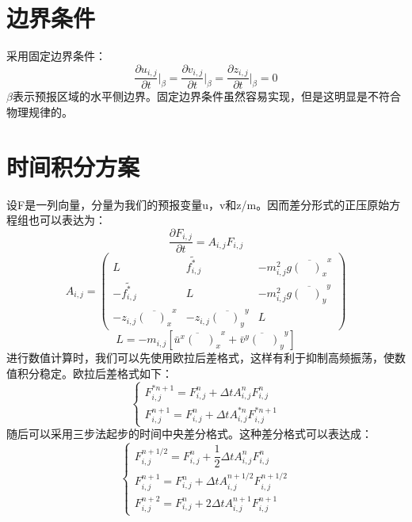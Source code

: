 \documentclass[a4paper,12pt]{article}
\begin{document}
\section{边界条件}
采用固定边界条件：
\begin{equation}
\dfrac{\partial{u_{i,j}}}{\partial{t}}\lvert_\beta=\dfrac{\partial{v_{i,j}}}{\partial{t}}\lvert_\beta=\dfrac{\partial{z_{i,j}}}{\partial{t}}\lvert_\beta=0
\end{equation}
$\beta$表示预报区域的水平侧边界。固定边界条件虽然容易实现，但是这明显是不符合物理规律的。

\section{时间积分方案}
设F是一列向量，分量为我们的预报变量u，v和z/m。因而差分形式的正压原始方程组也可以表达为：
\begin{equation}
\dfrac{\partial{F_{i,j}}}{\partial{t}}=A_{i,j}F_{i,j}
\end{equation}
\begin{equation}
A_{i,j}=
\left(
\begin{array}{ccc}
L & \widetilde{f_{i,j}^{\ast}} & -m_{i,j}^2g\overline{(\quad)_x}^x\\
-\widetilde{f_{i,j}^{\ast}} & L & -m_{i,j}^2g\overline{(\quad)_y}^y\\
-z_{i,j}\overline{(\quad)_x}^x & -z_{i,j}\overline{(\quad)_y}^y & L
\end{array}
\right)
\end{equation}
\begin{equation}
L=-m_{i,j}[\overline{\bar{u}^x(\quad)_x}^x+\overline{\bar{v}^y(\quad)_y}^y]
\end{equation}
进行数值计算时，我们可以先使用欧拉后差格式，这样有利于抑制高频振荡，使数值积分稳定。欧拉后差格式如下：
\begin{equation}
\begin{cases}
F_{i,j}^{\ast n+1}=F_{i,j}^n+\Delta t A_{i,j}^nF_{i,j}^n\\
F_{i,j}^{n+1}=F_{i,j}^n+\Delta t A_{i,j}^{\ast n}F_{i,j}^{\ast n+1}
\end{cases}
\end{equation}
随后可以采用三步法起步的时间中央差分格式。这种差分格式可以表达成：
\begin{equation}
\begin{cases}
F_{i,j}^{n+1/2}=F_{i,j}^n+\dfrac{1}{2}\Delta t A_{i,j}^n F_{i,j}^n\\
F_{i,j}^{n+1}=F_{i,j}^n+\Delta t A_{i,j}^{n+1/2} F_{i,j}^{n+1/2}\\
F_{i,j}^{n+2}=F_{i,j}^n+2\Delta t A_{i,j}^{n+1} F_{i,j}^{n+1}
\end{cases}
\end{equation}
\end{document}
